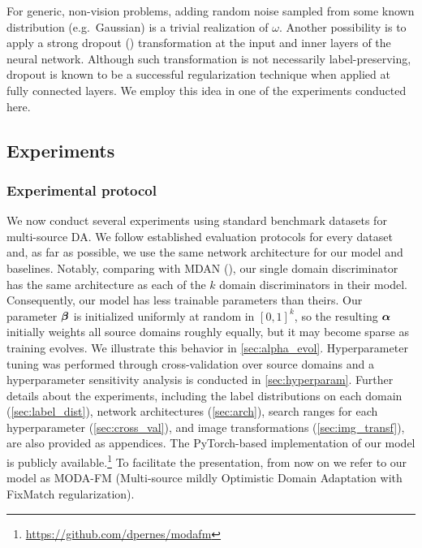 For generic, non-vision problems, adding random noise sampled from some known distribution (e.g.\ Gaussian) is a trivial realization of $\omega$. Another possibility is to apply a strong dropout (\citet{Srivastava2014}) transformation at the input and inner layers of the neural network. Although such transformation is not necessarily label-preserving, dropout is known to be a successful regularization technique when applied at fully connected layers. We employ this idea in one of the experiments conducted here.

\subsection{Experiments}
\label{sec:modafm_experiments}

\subsubsection{Experimental protocol}
We now conduct several experiments using standard benchmark datasets for multi-source DA. We follow established evaluation protocols for every dataset and, as far as possible, we use the same network architecture for our model and baselines. Notably, comparing with MDAN (\citet{Zhao2018}), our single domain discriminator has the same architecture as each of the $k$ domain discriminators in their model. Consequently, our model has less trainable parameters than theirs. Our parameter ${\bm{\beta}}$ is initialized uniformly at random in $[0,1]^k$, so the resulting ${\bm{\alpha}}$ initially weights all source domains roughly equally, but it may become sparse as training evolves. We illustrate this behavior in \ref{sec:alpha_evol}. Hyperparameter tuning was performed through cross-validation over source domains and a hyperparameter sensitivity analysis is conducted in \ref{sec:hyperparam}. Further details about the experiments, including the label distributions on each domain (\ref{sec:label_dist}), network architectures (\ref{sec:arch}), search ranges for each hyperparameter (\ref{sec:cross_val}), and image transformations (\ref{sec:img_transf}), are also provided as appendices. The PyTorch-based implementation of our model is publicly available.\footnote{\url{https://github.com/dpernes/modafm}} To facilitate the presentation, from now on we refer to our model as MODA-FM (Multi-source mildly Optimistic Domain Adaptation with FixMatch regularization). 

